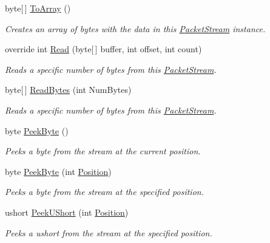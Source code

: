\begin{DoxyCompactItemize}
byte\mbox{[}$\,$\mbox{]} \hyperlink{class_gonzo_net_1_1_packet_stream_a2889a135f9a341c7ccf3a235cd71e005}{To\+Array} ()
\begin{DoxyCompactList}\small\item\em Creates an array of bytes with the data in this \hyperlink{class_gonzo_net_1_1_packet_stream}{Packet\+Stream} instance. \end{DoxyCompactList}\item 
override int \hyperlink{class_gonzo_net_1_1_packet_stream_a981d6db8f16b5fffde8821dd28125bb1}{Read} (byte\mbox{[}$\,$\mbox{]} buffer, int offset, int count)
\begin{DoxyCompactList}\small\item\em Reads a specific number of bytes from this \hyperlink{class_gonzo_net_1_1_packet_stream}{Packet\+Stream}. \end{DoxyCompactList}\item 
byte\mbox{[}$\,$\mbox{]} \hyperlink{class_gonzo_net_1_1_packet_stream_adc0b77fffc74b6c177d1f79e0a8be051}{Read\+Bytes} (int Num\+Bytes)
\begin{DoxyCompactList}\small\item\em Reads a specific number of bytes from this \hyperlink{class_gonzo_net_1_1_packet_stream}{Packet\+Stream}. \end{DoxyCompactList}\item 
byte \hyperlink{class_gonzo_net_1_1_packet_stream_a45295a98a183adc78aa41f3cd855eda8}{Peek\+Byte} ()
\begin{DoxyCompactList}\small\item\em Peeks a byte from the stream at the current position. \end{DoxyCompactList}\item 
byte \hyperlink{class_gonzo_net_1_1_packet_stream_a7abd531e88d15f46c9f1282e91f3d162}{Peek\+Byte} (int \hyperlink{class_gonzo_net_1_1_packet_stream_a31c12428a8c4be18a8230252c95f6bcc}{Position})
\begin{DoxyCompactList}\small\item\em Peeks a byte from the stream at the specified position. \end{DoxyCompactList}\item 
ushort \hyperlink{class_gonzo_net_1_1_packet_stream_a6914e493762f427bb2954e60104b76c8}{Peek\+U\+Short} (int \hyperlink{class_gonzo_net_1_1_packet_stream_a31c12428a8c4be18a8230252c95f6bcc}{Position})
\begin{DoxyCompactList}\small\item\em Peeks a ushort from the stream at the specified position. \end{DoxyCompactList}\item 

\end{DoxyCompactItemize}
